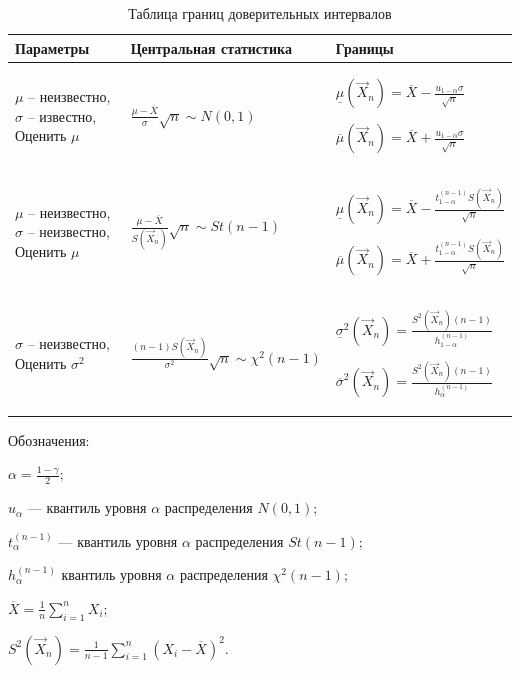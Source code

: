 \documentclass[a4paper,14pt, unknownkeysallowed]{extreport}
\begin{document}
\begin{center}
\captionsetup{justification=raggedright,singlelinecheck=off}
	\begin{longtable}[c]{|p{4cm}|p{7cm}|p{5cm}|}
	\caption{Таблица границ доверительных интервалов}
		\\ \hline
		Параметры & Центральная статистика & Границы 
		\\ \hline
		$\mu$ -- неизвестно,\newline 
		$\sigma$ -- известно,\newline 
		Оценить $\mu$ 
		& 
		\newline $\frac{\mu - \overline{X}}{\sigma} \sqrt{n} \sim N(0,1)$
		&  
		$\underline\mu(\vec X_n) = \overline{X} - \frac{u_{1 - \alpha} \sigma}{\sqrt{n}}$\newline
		
		$\overline\mu(\vec X_n) = \overline{X} + \frac{u_{1 - \alpha} \sigma}{\sqrt{n}}$
		\\ \hline
		$\mu$ -- неизвестно,\newline 
		$\sigma$ -- неизвестно,\newline 
		Оценить $\mu$ 
		&  
		\newline $\frac{\mu - \overline{X}}{S(\vec X_n)} \sqrt{n} \sim St(n - 1)$
		&  
		$\underline\mu(\vec X_n) = \overline{X} - \frac{t^{(n - 1)}_{1 - \alpha} S(\vec X_n)}{\sqrt{n}}$\newline
		
		$\overline\mu(\vec X_n) = \overline{X} + \frac{t^{(n - 1)}_{1 - \alpha} S(\vec X_n)}{\sqrt{n}}$
		\\ \hline
		$\sigma$ -- неизвестно,\newline 
		Оценить $\sigma^2$
		&  
		\newline $\frac{(n - 1) S(\vec X_n)}{\sigma^2} \sqrt{n} \sim \chi^2 (n - 1)$
		&    
		$\underline\sigma^2(\vec X_n) = \frac{S^2(\vec X_n) (n - 1)}{h^{(n - 1)}_{1 - \alpha}}$\newline
		
		$\overline\sigma^2(\vec X_n) = \frac{S^2(\vec X_n) (n - 1)}{h^{(n - 1)}_{\alpha}}$
	    \\ \hline
\end{longtable}
\end{center}

Обозначения:
\begin{center}
	$\alpha = \frac{1 - \gamma}{2}$;
	
	$u_{\alpha}$ --- квантиль уровня $\alpha$ распределения $N(0,1)$;

	$t_{\alpha}^{(n-1)}$ --- квантиль уровня $\alpha$ распределения $St(n - 1)$;
	
	$h_{\alpha}^{(n-1)}$ квантиль уровня $\alpha$ распределения $\chi^2 (n - 1)$; 
	
	$\overline{X} = \frac {1}{n} \sum_{i=1}^n X_i$;
	
	$S^2(\vec X_n) = \frac 1{n-1} \sum_{i=1}^n (X_i-\overline X)^2$.
\end{center}
\end{document}

